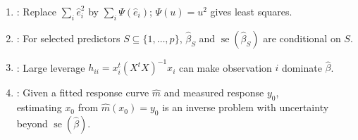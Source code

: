 \begin{perspective} \label{per:least-squares-extensions-source-chapter} 
\begin{enumerate}[label=(\roman*)]
\setlength{\itemsep}{0pt}
\item {}: Replace $\sum\limits_i\widehat{e}_i^2$ by $\sum\limits_i\Psi(\widehat{e}_i)$; $\Psi(u)=u^2$ gives least squares.
\item {}: For selected predictors $S\subseteq\{1,\ldots,p\}$, $\widehat{\beta}_S$ and $\operatorname{se}(\widehat{\beta}_S)$ are conditional on $S$.
\item {}: Large leverage $h_{ii}=x_i^t(X^tX)^{-1}x_i$ can make observation $i$ dominate $\widehat{\beta}$.
\item {}: Given a fitted response curve $\widehat{m}$ and measured response $y_0$,\\
estimating $x_0$ from $\widehat{m}(x_0)=y_0$ is an inverse problem with uncertainty beyond $\operatorname{se}(\widehat{\beta})$.
\end{enumerate}
\end{perspective}
